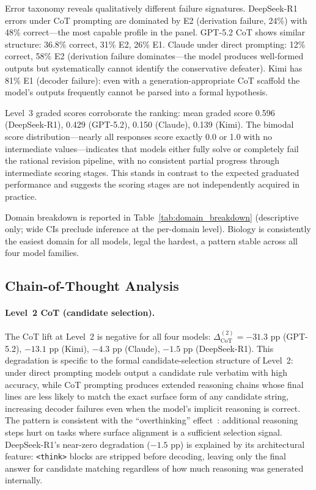 \documentclass{article}
\theoremstyle{definition}
\begin{document}
Error taxonomy reveals qualitatively different failure signatures. DeepSeek-R1 errors under CoT prompting are dominated by E2 (derivation failure, 24\%) with 48\% correct---the most capable profile in the panel. GPT-5.2 CoT shows similar structure: 36.8\% correct, 31\% E2, 26\% E1. Claude under direct prompting: 12\% correct, 58\% E2 (derivation failure dominates---the model produces well-formed outputs but systematically cannot identify the conservative defeater). Kimi has 81\% E1 (decoder failure): even with a generation-appropriate CoT scaffold the model's outputs frequently cannot be parsed into a formal hypothesis.

Level~3 graded scores corroborate the ranking: mean graded score 0.596 (DeepSeek-R1), 0.429 (GPT-5.2), 0.150 (Claude), 0.139 (Kimi). The bimodal score distribution---nearly all responses score exactly 0.0 or 1.0 with no intermediate values---indicates that models either fully solve or completely fail the rational revision pipeline, with no consistent partial progress through intermediate scoring stages. This stands in contrast to the expected graduated performance and suggests the scoring stages are not independently acquired in practice.

Domain breakdown is reported in Table~\ref{tab:domain_breakdown} (descriptive only; wide CIs preclude inference at the per-domain level). Biology is consistently the easiest domain for all models, legal the hardest, a pattern stable across all four model families.

\subsection{Chain-of-Thought Analysis}\label{subsec:cot_results}

\paragraph{Level~2 CoT (candidate selection).}
The CoT lift at Level~2 is negative for all four models: $\Delta_{\mathrm{CoT}}^{(2)} = -31.3$ pp (GPT-5.2), $-13.1$ pp (Kimi), $-4.3$ pp (Claude), $-1.5$ pp (DeepSeek-R1). This degradation is specific to the formal candidate-selection structure of Level~2: under direct prompting models output a candidate rule verbatim with high accuracy, while CoT prompting produces extended reasoning chains whose final lines are less likely to match the exact surface form of any candidate string, increasing decoder failures even when the model's implicit reasoning is correct. The pattern is consistent with the ``overthinking'' effect~\cite{chen2024overthinking}: additional reasoning steps hurt on tasks where surface alignment is a sufficient selection signal. DeepSeek-R1's near-zero degradation ($-1.5$ pp) is explained by its architectural feature: \texttt{<think>} blocks are stripped before decoding, leaving only the final answer for candidate matching regardless of how much reasoning was generated internally.
\end{document}
